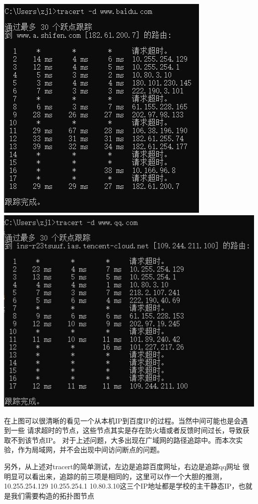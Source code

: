 \documentclass{article} %
\begin{document}
        \includegraphics[scale=0.6]{pic/教一追踪百度.JPG}\includegraphics[scale=0.6]{pic/教一追踪qq.JPG}
        \par 在上图可以很清晰的看见一个从本机IP到百度IP的过程。当然中间可能也是会遇到一些
        请求超时的节点，这些节点其实是存在防火墙或者反馈时间过长，导致获取不到该节点IP。
        对于上述问题，大多出现在广域网的路径追踪中。而本次实验，作为局域网，并不会出现中间访问断点的问题。
        \par 另外，从上述对tracert的简单测试，左边是追踪百度网址，右边是追踪qq网址
        很明显可以看出来，追踪的前三项是相同的，这里可以作一个大胆的推测，10.255.254.129   
        10.255.254.1   10.80.3.10这三个IP地址都是学校的主干静态IP，也就是我们需要构造的拓扑图节点
\end{document}
